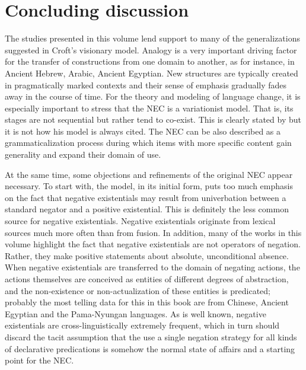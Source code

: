 \documentclass[output=paper,chinesefont,colorlinks,citecolor=brown]{langscibook}
\begin{document}
\section{Concluding discussion}\label{section:concluding_discussion}
The studies presented in this volume lend support to many of the generalizations suggested in Croft’s visionary model. Analogy is a very important driving factor for the transfer of constructions from one domain to another, as for instance, in Ancient Hebrew, Arabic, Ancient Egyptian. New structures are typically created in pragmatically marked contexts and their sense of emphasis gradually fades away in the course of time. For the theory and modeling of language change, it is especially important to stress that the NEC is a variationist model. That is, its stages are not sequential but rather tend to co-exist. This is clearly stated by \citet{Croft1991} but it is not how his model is always cited. The NEC can be also described as a grammaticalization process during which items with more specific content gain generality and expand their domain of use.

At the same time, some objections and refinements of the original NEC appear necessary. To start with, the model, in its initial form, puts too much emphasis on the fact that negative existentials may result from univerbation between a standard negator and a positive existential. This is definitely the less common source for negative existentials. Negative existentials originate from lexical sources much more often than from fusion. In addition, many of the works in this volume highlight the fact that negative existentials are not operators of negation. Rather, they make positive statements about absolute, unconditional absence. When negative existentials are transferred to the domain of negating actions, the actions themselves are conceived as entities of different degrees of abstraction, and the non-existence or non-actualization of these entities is predicated; probably the most telling data for this in this book are from Chinese, Ancient Egyptian and the Pama-Nyungan languages. As is well known, negative existentials are cross-linguistically extremely frequent, which in turn should discard the tacit assumption that the use a single negation strategy for all kinds of declarative predications is somehow the normal state of affairs and a starting point for the NEC.
\end{document}

